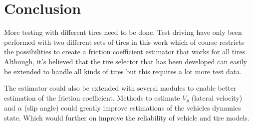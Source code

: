 \chapter{Conclusion}

More testing with different tires need to be done. Test driving have only been performed with two different sets of tires in this work which of course restricts the possibilities to create a friction coefficient estimator that works for all tires. Although, it's believed that the tire selector that has been developed can easily be extended to handle all kinds of tires but this requires a lot more test data.

The estimator could also be extended with several modules to enable better estimation of the friction coefficient. Methods to estimate $ V_{y} $ (lateral velocity) and $ \alpha $ (slip angle) could greatly improve estimations of the vehicles dynamics state. Which would further on improve the reliability of vehicle and tire models.

